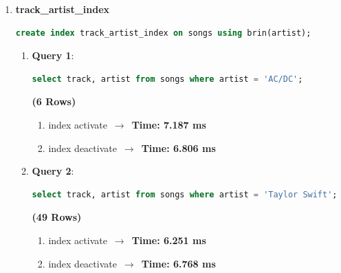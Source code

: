 \documentclass[10pt]{article}
\begin{document}
\begin{itemize}
\begin{enumerate}
\begin{enumerate}
        \end{enumerate}
        \item \textbf{track\_artist\_index}
        \begin{lstlisting}[language=SQL,
                deletekeywords={IDENTITY,INT},
                morekeywords={clustered},    
                framesep=10pt,
                framextopmargin=10pt]
    create index track_artist_index on songs using brin(artist);
            \end{lstlisting}
        \begin{enumerate}
            \item \textbf{Query 1}:
            \begin{lstlisting}[language=SQL,
                deletekeywords={IDENTITY,INT},
                morekeywords={clustered},    
                framesep=10pt,
                framextopmargin=10pt]
    select track, artist from songs where artist = 'AC/DC';
            \end{lstlisting}
            \textbf{(6 Rows)}
            \begin{enumerate}
                \item index activate $\,\to\,$ \textbf{Time: 7.187 ms}
                \item index deactivate $\,\to\,$ \textbf{Time: 6.806 ms}
                
            \end{enumerate}
            \item \textbf{Query 2}:
            \begin{lstlisting}[language=SQL,
                deletekeywords={IDENTITY,INT},
                morekeywords={clustered},    
                framesep=10pt,
                framextopmargin=10pt]
    select track, artist from songs where artist = 'Taylor Swift';
            \end{lstlisting}
            \textbf{(49 Rows)}
            \begin{enumerate}
                \item index activate $\,\to\,$ \textbf{Time: 6.251 ms}
                \item index deactivate $\,\to\,$ \textbf{Time: 6.768 ms}
                
            \end{enumerate}
        \end{enumerate}
    \end{enumerate}
    

\end{itemize}
\end{document}
